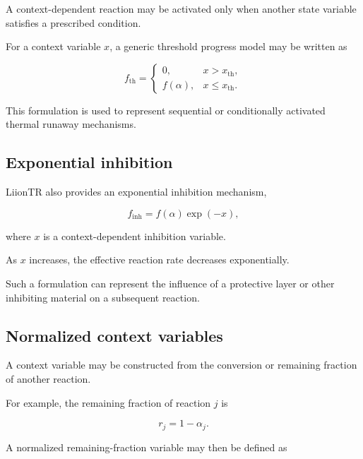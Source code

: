 A context-dependent reaction may be activated only when another state
variable satisfies a prescribed condition.

For a context variable $x$, a generic threshold progress model may be
written as

\begin{equation}
    f_{\mathrm{th}}
    =
    \begin{cases}
        0,
        & x > x_{\mathrm{th}},
        \\[6pt]
        f(\alpha),
        & x \leq x_{\mathrm{th}}.
    \end{cases}
    \label{eq:progress_threshold}
\end{equation}

This formulation is used to represent sequential or conditionally
activated thermal runaway mechanisms.


\subsection{Exponential inhibition}

LiionTR also provides an exponential inhibition mechanism,

\begin{equation}
    f_{\mathrm{inh}}
    =
    f(\alpha)
    \exp(-x),
    \label{eq:exponential_inhibition}
\end{equation}

where $x$ is a context-dependent inhibition variable.

As $x$ increases, the effective reaction rate decreases exponentially.

Such a formulation can represent the influence of a protective layer or
other inhibiting material on a subsequent reaction.


\subsection{Normalized context variables}

A context variable may be constructed from the conversion or remaining
fraction of another reaction.

For example, the remaining fraction of reaction $j$ is

\begin{equation}
    r_j
    =
    1-\alpha_j.
\end{equation}

A normalized remaining-fraction variable may then be defined as


